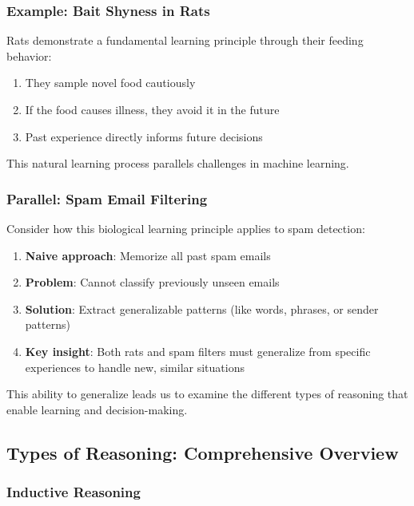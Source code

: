 \subsubsection{Example: Bait Shyness in Rats}
\label{subsubsec:bait-shyness-rats}

Rats demonstrate a fundamental learning principle through their feeding behavior:

\begin{enumerate}
\item They sample novel food cautiously
\item If the food causes illness, they avoid it in the future
\item Past experience directly informs future decisions
\end{enumerate}

This natural learning process parallels challenges in machine learning.

\subsubsection{Parallel: Spam Email Filtering}
\label{subsubsec:spam-filtering-parallel}

Consider how this biological learning principle applies to spam detection:

\begin{enumerate}
\item \textbf{Naive approach}: Memorize all past spam emails
\item \textbf{Problem}: Cannot classify previously unseen emails
\item \textbf{Solution}: Extract generalizable patterns (like words, phrases, or sender patterns)
\item \textbf{Key insight}: Both rats and spam filters must generalize from specific experiences to handle new, similar situations
\end{enumerate}

This ability to generalize leads us to examine the different types of reasoning that enable learning and decision-making.

\subsection{Types of Reasoning: Comprehensive Overview}
\label{subsec:types-reasoning}

\subsubsection{Inductive Reasoning}
\label{subsubsec:inductive-reasoning}

